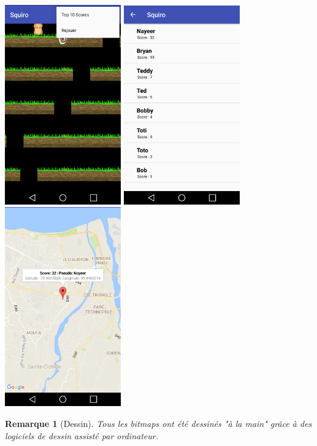 \documentclass[12pt,a4paper,abstract=on,parskip=full]{scrartcl}
\newtheorem*{remark}{Remarque}
\begin{document}
\hspace{5pt}
\linebreak
\vspace{30pt}
\hspace{5pt}
\includegraphics[width=5cm]{screenshot4.png}
\hspace{8pt}
\includegraphics[width=5cm]{screenshot5.png}
\hspace{8pt}
\includegraphics[width=5cm]{screenshot6.png}

\begin{remark}[Dessin]
Tous les bitmaps ont été dessinés "à la main" grâce à des logiciels de dessin assisté par ordinateur.
\end{remark}



\nocite{*}


\end{document}
